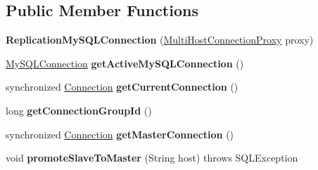 \subsection*{Public Member Functions}
\begin{DoxyCompactItemize}
\item 
\mbox{\label{classcom_1_1mysql_1_1jdbc_1_1_replication_my_s_q_l_connection_a2315e6524fe21d62e32fffa69c8b4fcd}} 
{\bfseries Replication\+My\+S\+Q\+L\+Connection} (\mbox{\hyperlink{classcom_1_1mysql_1_1jdbc_1_1_multi_host_connection_proxy}{Multi\+Host\+Connection\+Proxy}} proxy)
\item 
\mbox{\label{classcom_1_1mysql_1_1jdbc_1_1_replication_my_s_q_l_connection_a099de8dfb110fb097eecef7c270d49e6}} 
\mbox{\hyperlink{interfacecom_1_1mysql_1_1jdbc_1_1_my_s_q_l_connection}{My\+S\+Q\+L\+Connection}} {\bfseries get\+Active\+My\+S\+Q\+L\+Connection} ()
\item 
\mbox{\label{classcom_1_1mysql_1_1jdbc_1_1_replication_my_s_q_l_connection_a155762587895b272b232ff22d95f1a06}} 
synchronized \mbox{\hyperlink{interfacecom_1_1mysql_1_1jdbc_1_1_connection}{Connection}} {\bfseries get\+Current\+Connection} ()
\item 
\mbox{\label{classcom_1_1mysql_1_1jdbc_1_1_replication_my_s_q_l_connection_a0fee014c6a2c233e41b053a8baa14087}} 
long {\bfseries get\+Connection\+Group\+Id} ()
\item 
\mbox{\label{classcom_1_1mysql_1_1jdbc_1_1_replication_my_s_q_l_connection_a8688a54a049a9f533abad6db44eb71ec}} 
synchronized \mbox{\hyperlink{interfacecom_1_1mysql_1_1jdbc_1_1_connection}{Connection}} {\bfseries get\+Master\+Connection} ()
\item 
\mbox{\label{classcom_1_1mysql_1_1jdbc_1_1_replication_my_s_q_l_connection_a393a4f7cae26867de0abe2bd3b011a8b}} 
void {\bfseries promote\+Slave\+To\+Master} (String host)  throws S\+Q\+L\+Exception 
\item 

\end{DoxyCompactItemize}
